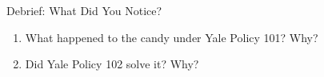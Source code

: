 \documentclass[9pt,english,aspectratio=169]{beamer}
\begin{document}




\begin{frame}{Debrief: What Did You Notice?}

  \begin{enumerate}
    \item What happened to the candy under Yale Policy 101? Why?
    \vspace{1em}
    \item Did Yale Policy 102 solve it? Why?
  \end{enumerate}

\end{frame}
\end{document}
